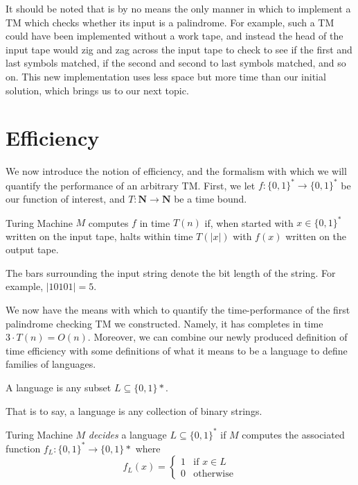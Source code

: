 \documentclass[usletter]{article}
\begin{document}
It should be noted that is by no means the only manner in which to implement a TM which checks whether its input is a palindrome. For example, such a TM could have been implemented without a work tape, and instead the head of the input tape would zig and zag across the input tape to check to see if the first and last symbols matched, if the second and second to last symbols matched, and so on. This new implementation uses less space but more time than our initial solution, which brings us to our next topic.

\section{Efficiency}

We now introduce the notion of efficiency, and the formalism with which we will quantify the performance of an arbitrary TM. First, we let $f : \{0,1\}^* \rightarrow \{0,1\}^*$ be our function of interest, and $T : \mathbf{N} \rightarrow \mathbf{N}$ be a time bound.

\begin{definition}
Turing Machine $M$ computes $f$ in time $T(n)$ if, when started with $x \in \{0,1\}^*$ written on the input tape, halts within time $T(|x|)$ with $f(x)$ written on the output tape.
\end{definition}

The bars surrounding the input string denote the bit length of the string. For example, $|10101| = 5$.

We now have the means with which to quantify the time-performance of the first palindrome checking TM we constructed. Namely, it has completes in time $3\cdot T(n) = O(n)$. Moreover, we can combine our newly produced definition of time efficiency with some definitions of what it means to be a language to define families of languages.

\begin{definition}
A language is any subset $L \subseteq \{0,1\}*$.
\end{definition}

That is to say, a language is any collection of binary strings.

\begin{definition}
Turing Machine $M$ \emph{decides} a language $L \subseteq \{0,1\}^*$ if $M$ computes the associated function $f_L : \{0,1\}^* \rightarrow \{0,1\}*$ where
\[f_L(x)= \begin{cases} 
      1 & \text{if } x \in L \\
      0 & \text{otherwise}
   \end{cases}
\]
\end{definition}
\end{document}
